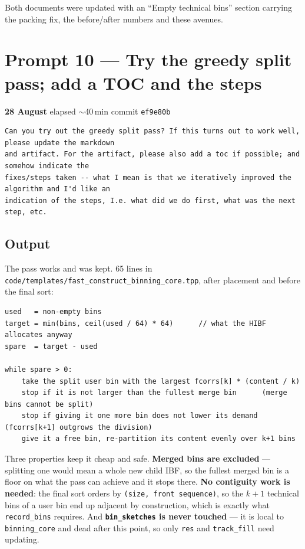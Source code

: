\documentclass[11pt,a4paper]{article}
\newenvironment{promptbox}{\medskip}{\medskip}
\newcommand{\code}[1]{\lstinline[basicstyle=\ttfamily\small]!#1!}
\newcommand{\sha}[1]{\texttt{#1}}
\begin{document}
\noindent Both documents were updated with an ``Empty technical bins'' section carrying the packing
fix, the before/after numbers and these avenues.

\section{Prompt 10 --- Try the greedy split pass; add a TOC and the steps}
\textbf{28 August} \textperiodcentered{} elapsed ${\sim}$40\,min \textperiodcentered{} commit \sha{ef9e80b}
\begin{promptbox}
\begin{lstlisting}[style=promptstyle]
Can you try out the greedy split pass? If this turns out to work well, please update the markdown
and artifact. For the artifact, please also add a toc if possible; and somehow indicate the
fixes/steps taken -- what I mean is that we iteratively improved the algorithm and I'd like an
indication of the steps, I.e. what did we do first, what was the next step, etc.
\end{lstlisting}
\end{promptbox}
\subsection*{Output}

The pass works and was kept. 65 lines in
\texttt{code/templates/fast\_construct\_binning\_core.tpp}, after placement and before the final
sort:

\begin{lstlisting}[style=codestyle]
used   = non-empty bins
target = min(bins, ceil(used / 64) * 64)      // what the HIBF allocates anyway
spare  = target - used

while spare > 0:
    take the split user bin with the largest fcorrs[k] * (content / k)
    stop if it is not larger than the fullest merge bin      (merge bins cannot be split)
    stop if giving it one more bin does not lower its demand (fcorrs[k+1] outgrows the division)
    give it a free bin, re-partition its content evenly over k+1 bins
\end{lstlisting}

\noindent Three properties keep it cheap and safe. \textbf{Merged bins are excluded} --- splitting
one would mean a whole new child IBF, so the fullest merged bin is a floor on what the pass can
achieve and it stops there. \textbf{No contiguity work is needed}: the final sort orders by
\texttt{(size, front sequence)}, so the $k+1$ technical bins of a user bin end up adjacent by
construction, which is exactly what \code{record_bins} requires. And \textbf{\code{bin_sketches} is
never touched} --- it is local to \code{binning_core} and dead after this point, so only \code{res}
and \code{track_fill} need updating.
\end{document}
